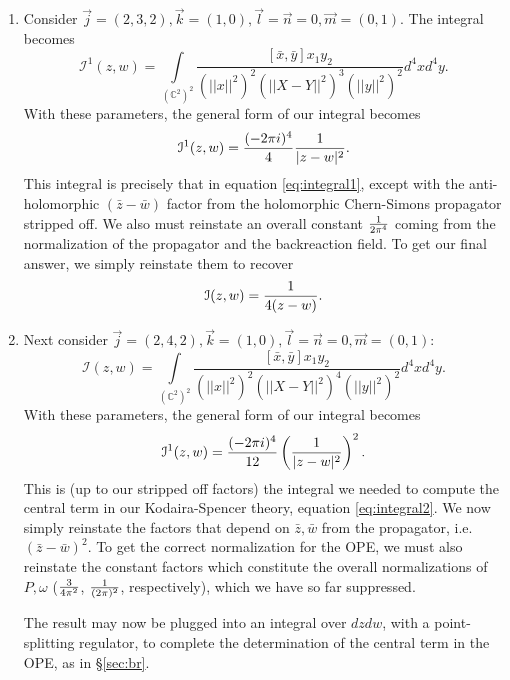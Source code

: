 \documentclass[../main.tex]{subfiles}
\begin{document}
\begin{enumerate}
\item Consider $\vec{j} = (2, 3, 2), \vec{k} = (1, 0), \vec{l} = \vec{n} = 0, \vec{m}= (0, 1)$. The integral becomes
\begin{equation}
    \mathcal{I}^1(z, w) = \underset{(\mathbb{C}^2)^2}{\int} \frac{[\bar{x}, \bar{y}] x_1 y_2}{(\vert \vert x \vert \vert^2)^2 (\vert \vert X - Y \vert \vert^2)^3 (\vert \vert y \vert \vert^2)^2 } d^4x d^4 y.
\end{equation}
With these parameters, the general form of our integral becomes
\begin{equation}
\mathcal{I}^1(z, w) = {(- 2 \pi i)^4 \over 4}{1 \over |z-w|^2}.
\end{equation}
This integral is precisely that in equation \ref{eq:integral1}, except with the anti-holomorphic $(\bar{z}-\bar{w})$ factor from the holomorphic Chern-Simons propagator stripped off. We also must reinstate an overall constant ${1 \over 2 \pi^4}$ coming from the normalization of the propagator and the backreaction field. To get our final answer, we simply reinstate them to recover
\begin{equation}
\mathcal{I}(z, w) = {1 \over 4 (z- w)}.
\end{equation}

\item Next consider $\vec{j} = (2, 4, 2), \vec{k} = (1, 0), \vec{l} = \vec{n} = 0, \vec{m}= (0, 1)$: 
\begin{equation}
    \mathcal{I}(z, w) = \underset{(\mathbb{C}^2)^2}{\int} \frac{[\bar{x}, \bar{y}] x_1 y_2}{(\vert \vert x \vert \vert^2)^2 (\vert \vert X - Y \vert \vert^2)^4 (\vert \vert y \vert \vert^2)^2 } d^4x d^4 y.
\end{equation}
With these parameters, the general form of our integral becomes
\begin{equation}
\mathcal{I}^{1}(z, w) = {(- 2 \pi i)^4 \over 12}\left({1 \over |z-w|^2}\right)^2.
\end{equation}
This is (up to our stripped off factors) the integral we needed to compute the central term in our Kodaira-Spencer theory, equation \ref{eq:integral2}. We now simply reinstate the factors that depend on $\bar{z}, \bar{w}$ from the propagator, i.e. $(\bar{z} - \bar{w})^2$. To get the correct normalization for the OPE, we must also reinstate the constant factors which constitute the overall normalizations of $P, \omega$ (${3 \over 4 \pi^2}$, ${1 \over (2 \pi)^2}$, respectively), which we have so far suppressed. 

The result may now be plugged into an integral over $d z dw$, with a point-splitting regulator, to complete the determination of the central term in the OPE, as in \S \ref{sec:br}.
\end{enumerate}
\end{document}

